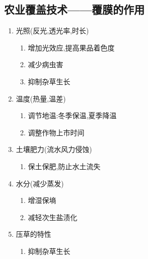 \documentclass[a4paper]{article}
\begin{document}
    \subsection{农业覆盖技术——覆膜的作用}
    \begin{enumerate}
        \item 光照(反光,透光率,时长)
        \begin{enumerate}
            \item 增加光效应,提高果品着色度
            \item 减少病虫害
            \item 抑制杂草生长
        \end{enumerate}
        \item 温度(热量,温差)
        \begin{enumerate}
            \item 调节地温:冬季保温,夏季降温
            \item 调整作物上市时间
        \end{enumerate}
        \item 土壤肥力(流水风力侵蚀)
        \begin{enumerate}
            \item 保土保肥,防止水土流失
        \end{enumerate}
        \item 水分(减少蒸发)
        \begin{enumerate}
            \item 增湿保墒
            \item 减轻次生盐渍化
        \end{enumerate}
        \item 压草的特性 %
        \begin{enumerate}
            \item 抑制杂草生长
        \end{enumerate}
    \end{enumerate}
\end{document}
